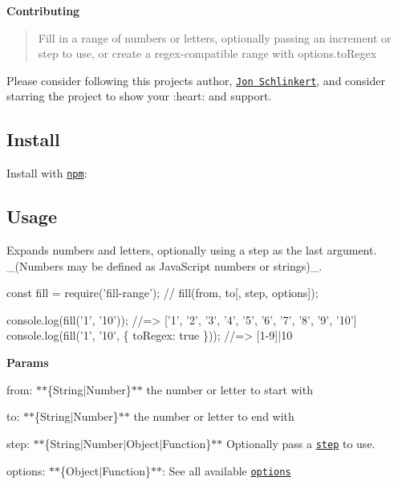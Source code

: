 {\bfseries Contributing}

\begin{quote}
Fill in a range of numbers or letters, optionally passing an increment or {\ttfamily step} to use, or create a regex-\/compatible range with {\ttfamily options.\+to\+Regex} \end{quote}


Please consider following this project\textquotesingle{}s author, \href{https://github.com/jonschlinkert}{\tt Jon Schlinkert}, and consider starring the project to show your \+:heart\+: and support.

\subsection*{Install}

Install with \href{https://www.npmjs.com/}{\tt npm}\+:




\subsection*{Usage}

Expands numbers and letters, optionally using a {\ttfamily step} as the last argument. \+\_\+(\+Numbers may be defined as Java\+Script numbers or strings)\+\_\+.


\begin{DoxyCode}
const fill = require('fill-range');
// fill(from, to[, step, options]);

console.log(fill('1', '10')); //=> ['1', '2', '3', '4', '5', '6', '7', '8', '9', '10']
console.log(fill('1', '10', \{ toRegex: true \})); //=> [1-9]|10
\end{DoxyCode}


{\bfseries Params}


\begin{DoxyItemize}
\item {\ttfamily from}\+: $\ast$$\ast$\{String$\vert$\+Number\}$\ast$$\ast$ the number or letter to start with
\item {\ttfamily to}\+: $\ast$$\ast$\{String$\vert$\+Number\}$\ast$$\ast$ the number or letter to end with
\item {\ttfamily step}\+: $\ast$$\ast$\{String$\vert$\+Number$\vert$\+Object$\vert$\+Function\}$\ast$$\ast$ Optionally pass a \href{#optionsstep}{\tt step} to use.
\item {\ttfamily options}\+: $\ast$$\ast$\{Object$\vert$\+Function\}$\ast$$\ast$\+: See all available \href{#options}{\tt options}
\end{DoxyItemize}

